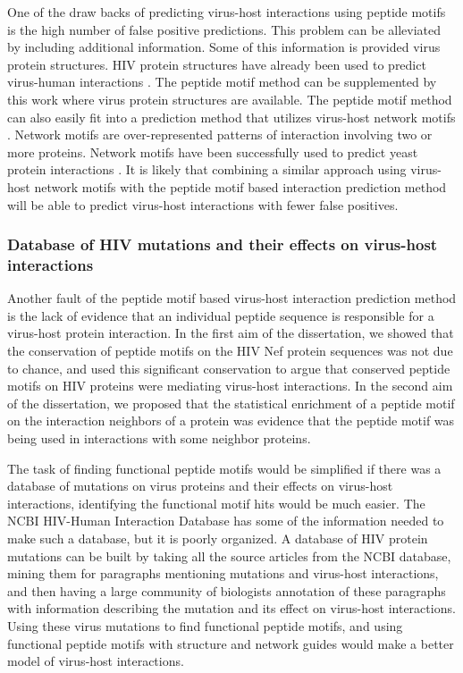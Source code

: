 One of the draw backs of predicting virus-host interactions using
peptide motifs is the high number of false positive predictions. This
problem can be alleviated by including additional information. Some of
this information is provided virus protein structures. HIV protein
structures have already been used to predict virus-human interactions
\cite{doolittle2010structural}. The peptide motif method can be
supplemented by this work where virus protein structures are
available. The peptide motif method can also easily fit into a
prediction method that utilizes virus-host network motifs
\cite{hivNetMotifs}. Network motifs are over-represented patterns of
interaction involving two or more proteins. Network motifs have been
successfully used to predict yeast protein interactions
\cite{albert2004conserved}. It is likely that combining a similar
approach using virus-host network motifs with the peptide motif based
interaction prediction method will be able to predict virus-host
interactions with fewer false positives.

\subsubsection{Database of HIV mutations and their effects on virus-host interactions}

Another fault of the peptide motif based virus-host interaction
prediction method is the lack of evidence that an individual peptide
sequence is responsible for a virus-host protein interaction. In the
first aim of the dissertation, we showed that the conservation of
peptide motifs on the HIV Nef protein sequences was not due to chance,
and used this significant conservation to argue that conserved peptide
motifs on HIV proteins were mediating virus-host interactions. In the
second aim of the dissertation, we proposed that the statistical
enrichment of a peptide motif on the interaction neighbors of a
protein was evidence that the peptide motif was being used in
interactions with some neighbor proteins.

The task of finding functional peptide motifs would be simplified if
there was a database of mutations on virus proteins and their effects
on virus-host interactions, identifying the functional motif hits
would be much easier. The NCBI HIV-Human Interaction Database has some
of the information needed to make such a database, but it is poorly
organized. A database of HIV protein mutations can be built by taking
all the source articles from the NCBI database, mining them for
paragraphs mentioning mutations and virus-host interactions, and then
having a large community of biologists annotation of these paragraphs
with information describing the mutation and its effect on virus-host
interactions. Using these virus mutations to find functional peptide
motifs, and using functional peptide motifs with structure and network
guides would make a better model of virus-host interactions.

